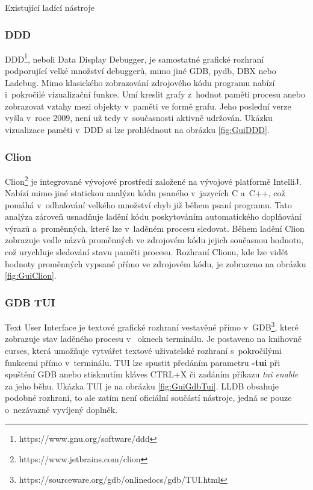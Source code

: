 \documentclass[czech,bachelor,male,python,dept460,hidelinks]{diploma}						%
\begin{document}
\begin{section}{Existující ladící nástroje}
		\subsubsection{DDD}
			DDD\footnote{https://www.gnu.org/software/ddd}, neboli Data Display Debugger, je samostatné grafické rozhraní podporující velké množství debuggerů,
			mimo jiné GDB, pydb, DBX nebo Ladebug.
			Mimo klasického zobrazování zdrojového kódu programu nabízí i~pokročilé vizualizační funkce. Umí kreslit grafy z~hodnot paměti procesu
			anebo zobrazovat vztahy mezi objekty v~paměti ve formě grafu. Jeho poslední verze vyšla v~roce 2009, není už tedy v~současnosti aktivně udržován.
			Ukázku vizualizace paměti v~DDD si lze prohlédnout na obrázku \ref{fig:GuiDDD}.
			
		
		\subsubsection{Clion}
		\label{ref:clion}
			Clion\footnote{https://www.jetbrains.com/clion} je integrované vývojové prostředí založené na vývojové platformě IntelliJ.
			Nabízí mimo jiné statickou analýzu kódu psaného v~jazycích C a~C++, což pomáhá v~odhalování velkého množství chyb již během psaní programu.
			Tato analýza zároveň usnadňuje ladění kódu poskytováním automatického doplňování výrazů a~proměnných, které lze v~laděném procesu sledovat.
			Během ladění Clion zobrazuje vedle názvů proměnných ve zdrojovém kódu jejich současnou hodnotu, což urychluje sledování stavu paměti procesu.
			Rozhraní Clionu, kde lze vidět hodnoty proměnných vypsané přímo ve zdrojovém kódu, je zobrazeno na obrázku \ref{fig:GuiClion}.
			
		
		\subsubsection{GDB TUI}
			Text User Interface je textové grafické rozhraní vestavěné přímo v~GDB\footnote{https://sourceware.org/gdb/onlinedocs/gdb/TUI.html},
			které zobrazuje stav laděného procesu v~ oknech terminálu. Je postaveno na knihovně curses, která umožňuje vytvářet textové uživatelské rozhraní
			s~pokročilými funkcemi přímo v~terminálu. TUI lze spustit předáním parametru \textbf{-tui} při spuštění GDB anebo stisknutím kláves CTRL+X či
			zadáním příkazu \emph{tui enable} za jeho běhu. Ukázka TUI je na obrázku \ref{fig:GuiGdbTui}.
			LLDB obsahuje podobné rozhraní, to ale zatím není oficiální součástí nástroje, jedná se pouze o~nezávazně vyvíjený doplněk.
			
			
\end{section}
\end{document}
